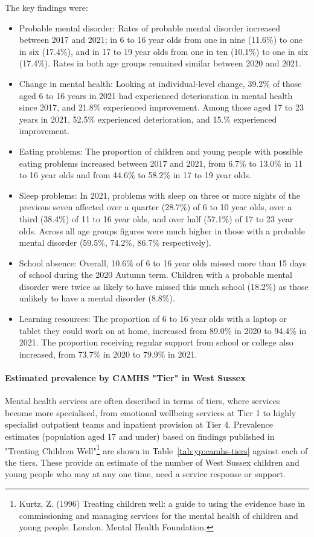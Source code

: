 The key findings were:
\begin{itemize}
    \item Probable mental disorder: Rates of probable mental disorder increased between 2017 and 2021; in 6 to 16 year olds from one in nine (11.6\%) to one in six (17.4\%), and in 17 to 19 year olds from one in ten (10.1\%) to one in six (17.4\%). Rates in both age groups remained similar between 2020 and 2021.
    \item Change in mental health: Looking at individual-level change, 39.2\% of those aged 6 to 16 years in 2021 had experienced deterioration in mental health since 2017, and 21.8\% experienced improvement. Among those aged 17 to 23 years in 2021, 52.5\% experienced deterioration, and 15.\% experienced improvement.
    \item Eating problems: The proportion of children and young people with possible eating problems increased between 2017 and 2021, from 6.7\% to 13.0\% in 11 to 16 year olds and from 44.6\% to 58.2\% in 17 to 19 year olds.
    \item Sleep problems: In 2021, problems with sleep on three or more nights of the previous seven affected over a quarter (28.7\%) of 6 to 10 year olds, over a third (38.4\%) of 11 to 16 year olds, and over half (57.1\%) of 17 to 23 year olds. Across all age groups figures were much higher in those with a probable mental disorder (59.5\%, 74.2\%, 86.7\% respectively).
    \item School absence: Overall, 10.6\% of 6 to 16 year olds missed more than 15 days of school during the 2020 Autumn term. Children with a probable mental disorder were twice as likely to have missed this much school (18.2\%) as those unlikely to have a mental disorder (8.8\%).
    \item Learning resources: The proportion of 6 to 16 year olds with a laptop or tablet they could work on at home, increased from 89.0\% in 2020 to 94.4\% in 2021. The proportion receiving regular support from school or college also increased, from 73.7\% in 2020 to 79.9\% in 2021.
\end{itemize}

\paragraph{Estimated prevalence by CAMHS "Tier" in West Sussex} Mental health services are often described in terms of tiers, where services become more specialised, from emotional wellbeing services at Tier 1 to highly specialist outpatient teams and inpatient provision at Tier 4. Prevalence estimates (population aged 17 and under) based on findings published in "Treating Children Well"\footnote{Kurtz, Z. (1996) Treating children well: a guide to using the evidence base in commissioning and managing services for the mental health of children and young people. London. Mental Health Foundation.} are shown in Table~\ref{tab:yp:camhs-tiers} against each of the tiers. These provide an estimate of the number of West Sussex children and young people who may at any one time, need a service response or support.

